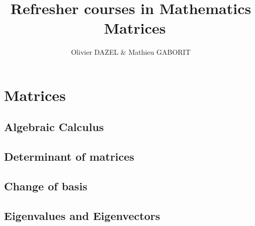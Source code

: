 \documentclass[10pt,a4paper]{report}
\title{\Large \textbf{Refresher courses in Mathematics}\\\
Matrices
}
\author{Olivier DAZEL \& Mathieu GABORIT}
\begin{document}
\maketitle




\chapter{Matrices}


\section{Algebraic Calculus}








%


\section{Determinant of matrices}









%


\section{Change of basis}





\section{Eigenvalues and Eigenvectors}

%




\end{document}
